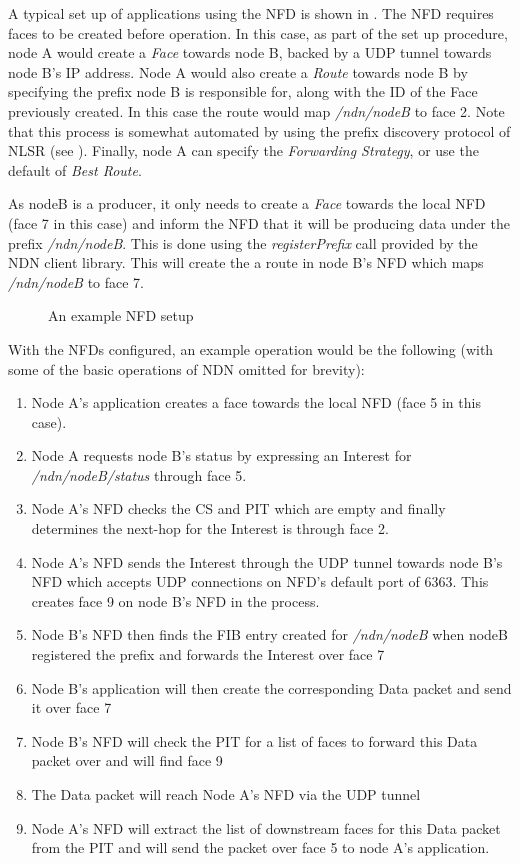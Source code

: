  A typical set up of applications using the NFD is shown in . The NFD requires faces to be created before operation. In this case, as part of the set up procedure, node A would create a \textit{Face} towards node B, backed by a UDP tunnel towards node B's IP address. Node A would also create a \textit{Route} towards node B by specifying the prefix node B is responsible for, along with the ID of the Face previously created. In this case the route would map \textit{/ndn/nodeB} to face 2. Note that this process is somewhat automated by using the prefix discovery protocol of NLSR (see ). Finally, node A can specify the \textit{Forwarding Strategy}, or use the default of \textit{Best Route}.


As nodeB is a producer, it only needs to create a \textit{Face} towards the local NFD (face 7 in this case) and inform the NFD that it will be producing data under the prefix \textit{/ndn/nodeB}. This is done using the  \textit{registerPrefix} call provided by the NDN client library. This will create the a route in node B's NFD which maps \textit{/ndn/nodeB} to face 7.
\begin{figure}[H]
    \centering
    \caption{An example NFD setup}
    \label{fig:nfd-setup}
\end{figure}

With the NFDs configured, an example operation would be the following (with some of the basic operations of NDN omitted for brevity):

\begin{enumerate}
    \item Node A's application creates a face towards the local NFD (face 5 in this case).
    \item Node A requests node B's status by expressing an Interest for \textit{/ndn/nodeB/status} through face 5.
    \item Node A's NFD checks the CS and PIT which are empty and finally determines the next-hop for the Interest is through face 2.
    \item Node A's NFD sends the Interest through the UDP tunnel towards node B's NFD which accepts UDP connections on NFD's default port of 6363. This creates face 9 on node B's NFD in the process.
    \item Node B's NFD then finds the FIB entry created for \textit{/ndn/nodeB} when nodeB registered the prefix and forwards the Interest over face 7
    \item Node B's application will then create the corresponding Data packet and send it over face 7
    \item Node B's NFD will check the PIT for a list of faces to forward this Data packet over and will find face 9
    \item The Data packet will reach Node A's NFD via the UDP tunnel
    \item Node A's NFD will extract the list of downstream faces for this Data packet from the PIT and will send the packet over face 5 to node A's application.
\end{enumerate}





